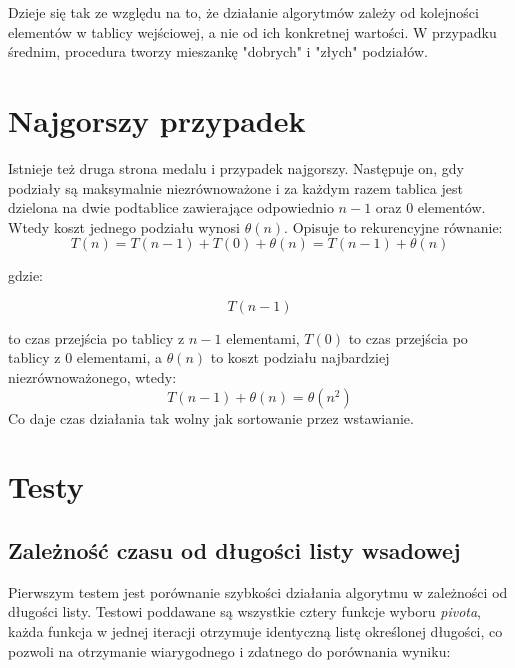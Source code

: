 \documentclass[a4paper,11pt]{report}
\begin{document}
Dzieje się tak ze względu na to, że działanie algorytmów zależy od kolejności elementów w tablicy wejściowej, a nie od ich konkretnej wartości. W przypadku średnim, procedura tworzy mieszankę "dobrych" i "złych" podziałów.

\section{Najgorszy przypadek}
Istnieje też druga strona medalu i przypadek najgorszy. Następuje on, gdy podziały są maksymalnie niezrównoważone i za każdym razem tablica jest dzielona na dwie podtablice zawierające odpowiednio $n-1$ oraz 0 elementów. Wtedy koszt jednego podziału wynosi $\theta (n)$. Opisuje to rekurencyjne równanie:
\begin{equation*}
T(n) = T(n-1) + T(0) + \theta(n) = T(n-1) + \theta(n)
\end{equation*}

gdzie:

\begin{equation*}
T(n-1)
\end{equation*}

to czas przejścia po tablicy z $n-1$ elementami, $T(0)$ to czas przejścia po tablicy z 0 elementami, a $\theta(n)$ to koszt podziału najbardziej niezrównoważonego, wtedy:
\begin{equation*}
T(n-1) + \theta(n) = \theta(n^2)
\end{equation*}
Co daje czas działania tak wolny jak sortowanie przez wstawianie.

\section{Testy}
\subsection{Zależność czasu od długości listy wsadowej}
Pierwszym testem jest porównanie szybkości działania algorytmu w zależności od długości listy. Testowi poddawane są wszystkie cztery funkcje wyboru \textit{pivota}, każda funkcja w jednej iteracji otrzymuje identyczną listę określonej długości, co pozwoli na otrzymanie wiarygodnego i zdatnego do porównania wyniku:
\end{document}
